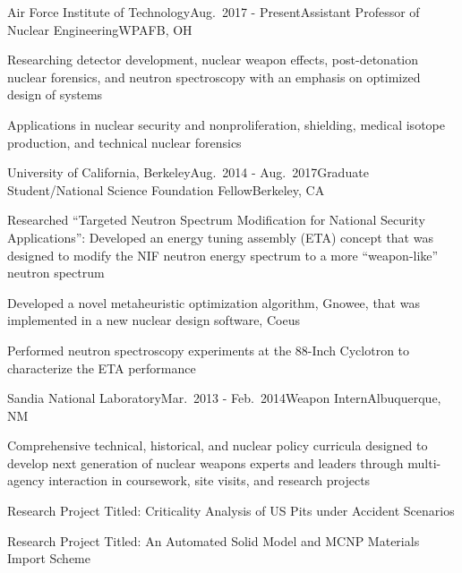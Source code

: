 \begin{rSubsection}{Air Force Institute of Technology}{Aug.\ 2017 - Present}{Assistant Professor of Nuclear Engineering}{WPAFB, OH}
\item Researching detector development, nuclear weapon effects, post-detonation nuclear forensics, and neutron spectroscopy with an emphasis on optimized design of systems
\item Applications in nuclear security and nonproliferation, shielding, medical isotope production, and technical nuclear forensics
\end{rSubsection}

\begin{rSubsection}{University of California, Berkeley}{Aug.\ 2014 - Aug.\ 2017}{Graduate Student/National Science Foundation Fellow}{Berkeley, CA}
\item Researched \enquote{Targeted Neutron Spectrum Modification for National Security Applications}: Developed an energy tuning assembly (ETA) concept that was designed to modify the NIF neutron energy spectrum to a more \enquote{weapon-like} neutron spectrum
\item Developed a novel metaheuristic optimization algorithm, Gnowee, that was implemented in a new nuclear design software, Coeus
\item Performed neutron spectroscopy experiments at the 88-Inch Cyclotron to characterize the ETA performance
\end{rSubsection}


\begin{rSubsection}{Sandia National Laboratory}{Mar.\ 2013 - Feb.\ 2014}{Weapon Intern}{Albuquerque, NM}
\item Comprehensive technical, historical, and nuclear policy curricula designed to develop next generation of nuclear weapons experts and leaders through multi-agency interaction in coursework, site visits, and research projects
\item Research Project Titled: Criticality Analysis of US Pits under Accident Scenarios
\item Research Project Titled: An Automated Solid Model and MCNP Materials Import Scheme
\end{rSubsection}



